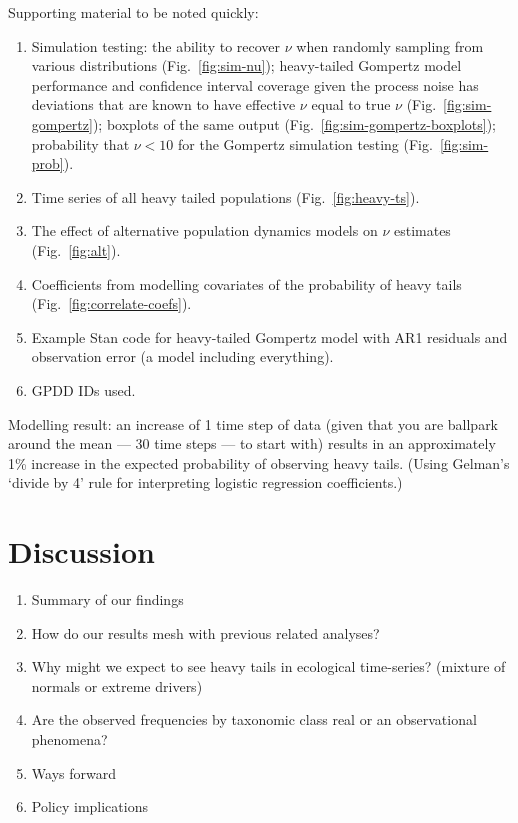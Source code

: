 \documentclass[12pt]{article}
\begin{document}

Supporting material to be noted quickly:

\begin{enumerate}

  \item Simulation testing: the ability to recover $\nu$ when randomly sampling from various distributions (Fig.~\ref{fig:sim-nu}); heavy-tailed Gompertz model performance and confidence interval coverage given the process noise has deviations that are known to have effective $\nu$ equal to true $\nu$ (Fig.~\ref{fig:sim-gompertz}); boxplots of the same output (Fig.~\ref{fig:sim-gompertz-boxplots}); probability that $\nu < 10$ for the Gompertz simulation testing (Fig.~\ref{fig:sim-prob}).

  \item Time series of all heavy tailed populations (Fig.~\ref{fig:heavy-ts}).

  \item The effect of alternative population dynamics models on $\nu$ estimates (Fig.~\ref{fig:alt}).

  \item Coefficients from modelling covariates of the probability of heavy tails (Fig.~\ref{fig:correlate-coefs}).

  \item Example Stan code for heavy-tailed Gompertz model with AR1 residuals and observation error (a model including everything).

  \item GPDD IDs used.

\end{enumerate}

Modelling result: an increase of 1 time step of data (given that you are ballpark around the mean --- 30 time steps --- to start with) results in an approximately 1\% increase in the expected probability of observing heavy tails. (Using Gelman's `divide by 4' rule for interpreting logistic regression coefficients.)

\section{Discussion}

\begin{enumerate}
  \item Summary of our findings
  \item How do our results mesh with previous related analyses?
  \item Why might we expect to see heavy tails in ecological time-series? (mixture of normals or extreme drivers)
  \item Are the observed frequencies by taxonomic class real or an observational phenomena?
  \item Ways forward
  \item Policy implications
\end{enumerate}
\end{document}
